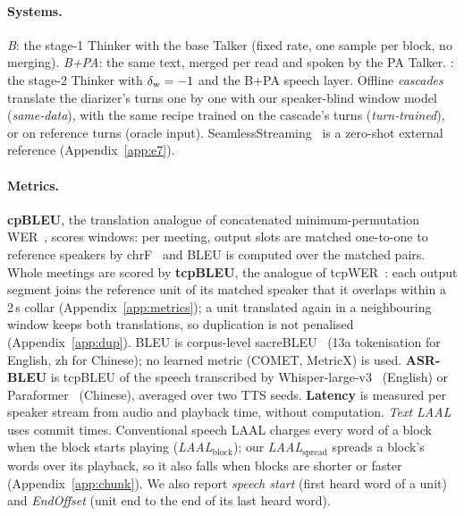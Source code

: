 \paragraph{Systems.} \emph{B}: the stage-1 Thinker with the base Talker (fixed rate, one sample per block, no
merging). \emph{B+PA}: the same text, merged per read and spoken by the PA Talker. \emph{\sys{}}: the stage-2 Thinker
with $\delta_{\mathrm{w}}=-1$ and the B+PA speech layer. Offline \emph{cascades} translate the diarizer's turns one by one with our
speaker-blind window model (\emph{same-data}), with the same recipe trained on the cascade's turns
(\emph{turn-trained}), or on reference turns (oracle input). SeamlessStreaming~\citep{seamless2023} is a zero-shot
external reference (Appendix~\ref{app:e7}).

\paragraph{Metrics.} \textbf{cpBLEU}, the translation analogue of concatenated minimum-permutation
WER~\citep{watanabe2020chime6}, scores windows: per meeting, output slots are matched one-to-one to reference speakers by
chrF~\citep{popovic2015chrf} and BLEU is computed over the matched pairs. Whole meetings are scored by \textbf{tcpBLEU},
the analogue of tcpWER~\citep{neumann2023meeteval}: each output segment joins the reference unit of its matched speaker
that it overlaps within a 2\,s collar (Appendix~\ref{app:metrics}); a unit translated again in a neighbouring window
keeps both translations, so duplication is not penalised (Appendix~\ref{app:dup}). BLEU is corpus-level
sacreBLEU~\citep{post2018call} (13a tokenisation for English, zh for Chinese); no learned metric (COMET, MetricX) is used.
\textbf{ASR-BLEU} is tcpBLEU of the speech transcribed by Whisper-large-v3~\citep{radford2023robust} (English) or
Paraformer~\citep{gao2022paraformer} (Chinese), averaged over two TTS seeds. \textbf{Latency} is measured per speaker
stream from audio and playback time, without computation. \emph{Text LAAL}~\citep{papi2022over} uses commit times.
Conventional speech LAAL charges every word of a block when the block starts playing (\emph{LAAL$_\text{block}$}); our
\emph{LAAL$_\text{spread}$} spreads a block's words over its playback, so it also falls when blocks are shorter or
faster (Appendix~\ref{app:chunk}). We also report \emph{speech start} (first heard word of a unit) and \emph{EndOffset}
(unit end to the end of its last heard word).

